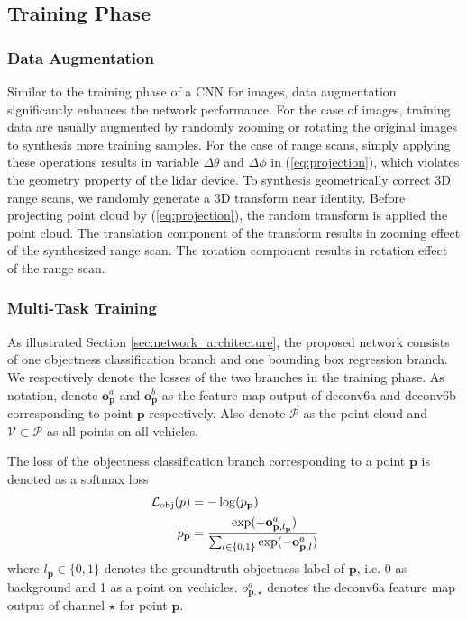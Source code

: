 \documentclass[conference]{IEEEtran}
\begin{document}
\subsection{Training Phase}
\subsubsection{Data Augmentation}
Similar to the training phase of a CNN for images, data augmentation significantly enhances the network performance. For the case of images, training data are usually augmented by randomly zooming or rotating the original images to synthesis more training samples. For the case of range scans, simply applying these operations results in variable $\Delta \theta$ and $\Delta \phi$ in (\ref{eq:projection}), which violates the geometry property of the lidar device. To synthesis geometrically correct 3D range scans, we randomly generate a 3D transform near identity. Before projecting point cloud by (\ref{eq:projection}), the random transform is applied the point cloud. The translation component of the transform results in zooming effect of the synthesized range scan. The rotation component results in rotation effect of the range scan. 

\subsubsection{Multi-Task Training}
As illustrated Section \ref{sec:network_architecture}, the proposed network consists of one objectness classification branch and one bounding box regression branch. We respectively denote the losses of the two branches in the training phase. As notation, denote $\mathbf{o}^a_\mathbf{p}$ and $\mathbf{o}^b_\mathbf{p}$ as the feature map output of deconv6a and deconv6b corresponding to point $\mathbf{p}$ respectively. Also denote $\mathcal{P}$ as the point cloud and $\mathcal{V} \subset \mathcal{P}$ as all points on all vehicles.

The loss of the objectness classification branch corresponding to a point $\mathbf{p}$ is denoted as a softmax loss
\begin{equation}
\begin{aligned}
    \mathcal{L}_\textrm{obj}(p) &= - \log (p_\mathbf{p}) \\
    p_\mathbf{p} &= \cfrac{\exp (-\mathbf{o}^a_{\mathbf{p}, l_\mathbf{p}})}{ \sum_{l \in \{0, 1\}}{\exp (-\mathbf{o}^a_{\mathbf{p}, l})}}
\end{aligned}
\label{eq:object_loss}
\end{equation}
where $l_\mathbf{p} \in \{0, 1\}$ denotes the groundtruth objectness label of $\mathbf{p}$, i.e. 0 as background and 1 as a point on vechicles.  $o^a_{\mathbf{p}, \star}$ denotes the deconv6a feature map output of channel $\star$ for point $\mathbf{p}$.
\end{document}

